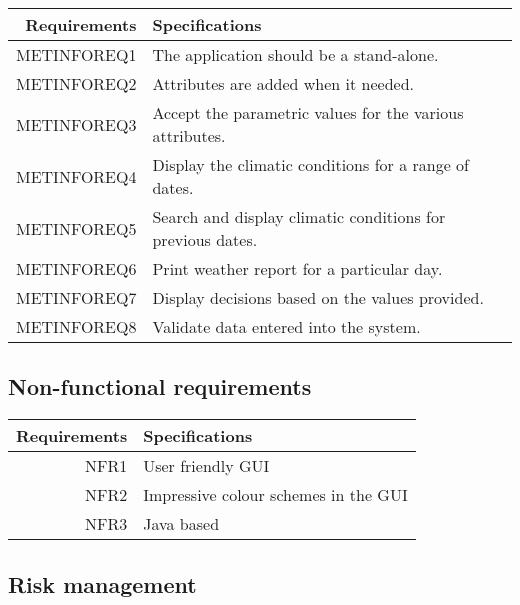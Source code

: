 \documentclass{article}
\begin{document}
\begin{center}
\begin{tabular}{|r|l|}

\hline
Requirements & Specifications\\[5pt]
\hline

METINFOREQ1 &
The application should be a stand-alone. 
\\\hline

METINFOREQ2 &
Attributes are added when it needed.
\\\hline

METINFOREQ3&
Accept the parametric values for the various attributes.
\\\hline

METINFOREQ4&
Display the climatic conditions for a range of dates.
\\\hline

METINFOREQ5&
Search and display climatic conditions for previous dates.
\\\hline

METINFOREQ6&
Print weather report for a particular day. 
\\\hline

METINFOREQ7&
Display decisions based on the values provided.
\\\hline

METINFOREQ8&
Validate data entered into the system.
\\\hline
\end{tabular}
\end{center}

\subsection{Non-functional requirements}

\begin{tabular}{|r|l|}

\hline
Requirements & Specifications\\[5pt]
\hline
NFR1&
User friendly GUI
\\\hline

NFR2&
Impressive colour schemes in the GUI
\\\hline

NFR3&
Java based
\\\hline

\end{tabular}

\subsection{Risk management}
\label{sec:riskman}
\pagebreak





\end{document}
